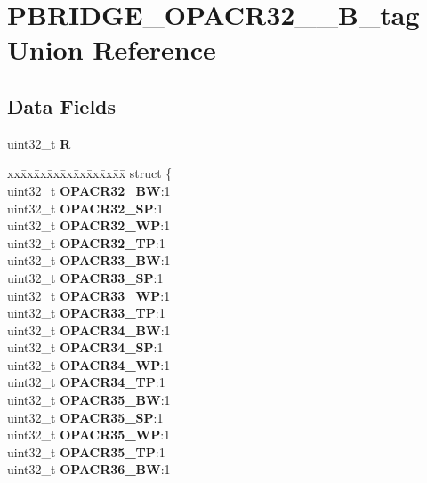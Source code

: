 \hypertarget{unionPBRIDGE__OPACR32__39__32B__tag}{}\section{P\+B\+R\+I\+D\+G\+E\+\_\+\+O\+P\+A\+C\+R32\+\_\+\_\+B\+\_\+tag Union Reference}
\label{unionPBRIDGE__OPACR32__39__32B__tag}
\subsection*{Data Fields}
\begin{DoxyCompactItemize}
\item 
\mbox{\label{unionPBRIDGE__OPACR32__39__32B__tag_ae6b5b01974a891222fc217d63c3e825f}} 
uint32\+\_\+t {\bfseries R}
\item 
\mbox{\label{unionPBRIDGE__OPACR32__39__32B__tag_a7b6531b6ca7f38cd0d87e02002e95a08}} 
\begin{tabbing}
xx\=xx\=xx\=xx\=xx\=xx\=xx\=xx\=xx\=\kill
struct \{\\
\>uint32\_t {\bfseries OPACR32\_BW}:1\\
\>uint32\_t {\bfseries OPACR32\_SP}:1\\
\>uint32\_t {\bfseries OPACR32\_WP}:1\\
\>uint32\_t {\bfseries OPACR32\_TP}:1\\
\>uint32\_t {\bfseries OPACR33\_BW}:1\\
\>uint32\_t {\bfseries OPACR33\_SP}:1\\
\>uint32\_t {\bfseries OPACR33\_WP}:1\\
\>uint32\_t {\bfseries OPACR33\_TP}:1\\
\>uint32\_t {\bfseries OPACR34\_BW}:1\\
\>uint32\_t {\bfseries OPACR34\_SP}:1\\
\>uint32\_t {\bfseries OPACR34\_WP}:1\\
\>uint32\_t {\bfseries OPACR34\_TP}:1\\
\>uint32\_t {\bfseries OPACR35\_BW}:1\\
\>uint32\_t {\bfseries OPACR35\_SP}:1\\
\>uint32\_t {\bfseries OPACR35\_WP}:1\\
\>uint32\_t {\bfseries OPACR35\_TP}:1\\
\>uint32\_t {\bfseries OPACR36\_BW}:1\\

\end{tabbing}
\end{DoxyCompactItemize}
